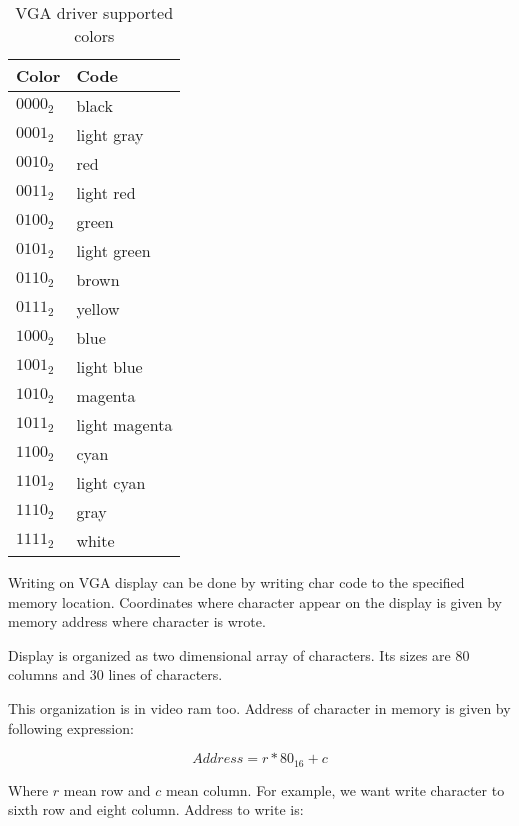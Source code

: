 \begin{table}[h]
    \centering
    \begin{tabular}{|l|l|}
        \hline
        \textbf{Color} & \textbf{Code}  \\ \hline
        $0000_{2}$     & black          \\ \hline
        $0001_{2}$     & light gray     \\ \hline
        $0010_{2}$     & red            \\ \hline
        $0011_{2}$     & light red      \\ \hline
        $0100_{2}$     & green          \\ \hline
        $0101_{2}$     & light green    \\ \hline
        $0110_{2}$     & brown          \\ \hline
        $0111_{2}$     & yellow         \\ \hline
        $1000_{2}$     & blue           \\ \hline
        $1001_{2}$     & light blue     \\ \hline
        $1010_{2}$     & magenta        \\ \hline
        $1011_{2}$     & light magenta  \\ \hline
        $1100_{2}$     & cyan           \\ \hline
        $1101_{2}$     & light cyan     \\ \hline
        $1110_{2}$     & gray           \\ \hline
        $1111_{2}$     & white          \\ \hline
    \end{tabular}
    \caption{VGA driver supported colors}
    \label{tab:vga_colors_codes}
\end{table}

Writing on VGA display can be done by writing char code to the specified memory
location. Coordinates where character appear on the display is given by memory
address where character is wrote.

Display is organized as two dimensional array of characters. Its sizes are 80
columns and 30 lines of characters.

This organization is in video ram too. Address of character in memory is given
by following expression:

$$
    Address = r * 80_{16} + c
$$

Where $r$ mean row and $c$ mean column. For example, we want write character to
sixth row and eight column. Address to write is:

